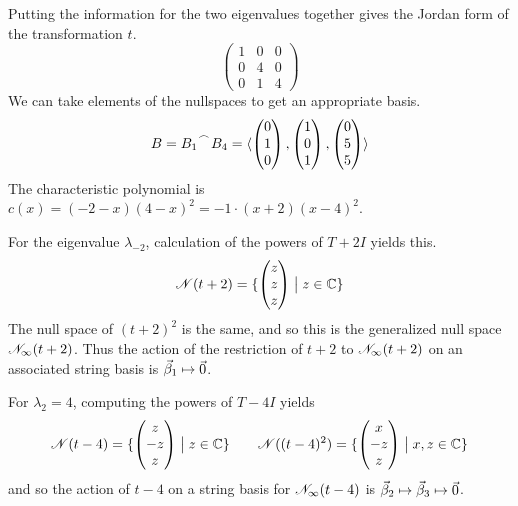 \begin{exercises}
\begin{answer}
\begin{exparts}
            Putting the information for the two eigenvalues 
            together gives the Jordan form of the transformation $t$.
            \begin{equation*}
              \begin{pmatrix}
                1  &0  &0  \\
                0  &4  &0  \\
                0  &1  &4
              \end{pmatrix}
            \end{equation*}
            We can take elements of the nullspaces to get an appropriate
            basis.
            \begin{equation*}
              B=\cat{B_{1}}{B_4}=
               \sequence{\colvec{0 \\ 1 \\ 0},
                          \colvec{1 \\ 0 \\ 1},
                          \colvec{0 \\ 5 \\ 5}}
            \end{equation*}
        \partsitem The characteristic polynomial is 
            \( c(x)=(-2-x)(4-x)^2=-1\cdot (x+2)(x-4)^2 \).

            For the eigenvalue $\lambda_{-2}$, calculation of the
            powers of $T+2I$ yields this.
            \begin{equation*}
              \mathscr{N}(t+2)=\mbox{$\{\begin{pmatrix} z \\ z \\ z \end{pmatrix}
                                      \bigm| z\in\mathbb{C}\}$}
            \end{equation*}
            The null space of $(t+2)^2$ is the same, and so 
            this is the generalized null space $\mathscr{N}_\infty(t+2)$.
            Thus the action of the restriction of $t+2$ to 
            $\mathscr{N}_\infty(t+2)$ on an associated
            string basis is $\vec{\beta}_1\mapsto\vec{0}$.

            For $\lambda_2=4$, 
            computing the powers of $T-4I$ yields 
            \begin{equation*}
              \mathscr{N}(t-4)=\mbox{$\{\begin{pmatrix} z \\ -z \\ z \end{pmatrix}
                                      \bigm| z\in\mathbb{C}\}$} 
              \qquad
              \mathscr{N}((t-4)^2)=\mbox{$\{\begin{pmatrix} x \\ -z \\ z \end{pmatrix}
                                           \bigm| x,z\in\mathbb{C}\}$}
            \end{equation*}
            and so the action of $t-4$ on a string basis for 
            $\mathscr{N}_\infty(t-4)$ is
            $\vec{\beta}_2\mapsto\vec{\beta}_3\mapsto\vec{0}$.


\end{exparts}
\end{answer}
\end{exercises}
